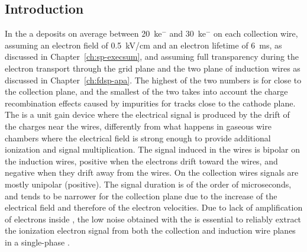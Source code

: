 \subsection{Introduction}
\label{sec:fdsp-tpcelec-overview-intro}


In the   a  deposits on average between
\SI{20}{k}{e$^-$} and \SI{30}{k}{e$^-$} on each collection wire, assuming an electron field
of \SI{0.5}{kV/cm} and an electron lifetime of \SI{6}{ms}, as discussed in
Chapter~\ref{ch:sp-execsum}, and assuming full transparency during the 
electron transport through the grid plane and the two plane of induction
wires as discussed in Chapter~\ref{ch:fdsp-apa}. The highest of the two numbers 
is for  close to the collection plane, and the smallest of the two
takes into account the charge recombination effects caused by impurities for 
tracks close to the cathode plane. The    is 
a unit gain device where the electrical signal is produced by the drift of the
charges near the wires, differently from what happens in gaseous wire 
chambers where the electrical field is strong enough to provide additional
ionization and signal multiplication. The signal induced in the 
 wires is bipolar on the induction wires, positive when the
electrons drift toward the wires, and negative when they drift away from
the wires. On the collection wires signals are mostly unipolar (positive).
The signal duration is of the order of microseconds, and tends to be narrower
for the collection plane due to the increase of the electrical field and
therefore of the electron velocities. Due to lack of amplification of 
electrons inside , the low noise obtained with the  is
essential to reliably extract the ionization electron signal from both the 
collection and induction wire planes in a single-phase  .

